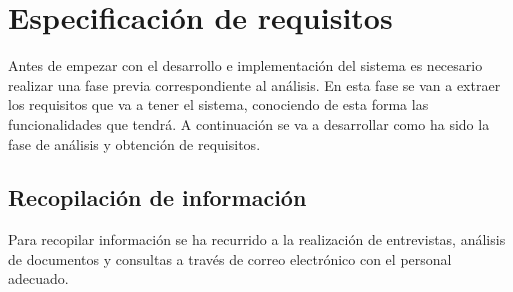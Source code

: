 \chapter{Especificación de requisitos}\label{cap:especificación}

Antes de empezar con el desarrollo e implementación del sistema es necesario realizar una fase previa correspondiente
al análisis. En esta fase se van a extraer los requisitos que va a tener el sistema, conociendo de esta forma las 
funcionalidades que tendrá. A continuación se va a desarrollar como ha sido la fase de análisis y obtención de 
requisitos.

\section{Recopilación de información}

Para recopilar información se ha recurrido a la realización de entrevistas, análisis de documentos y consultas a través
de correo electrónico con el personal adecuado.

